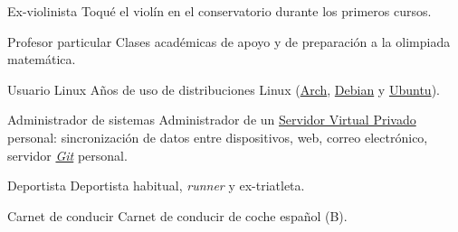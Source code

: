 

\cvachievement{\faMusic}
{Ex-violinista \smallskip}
{\small {}%
  \small{}}
Toqué el violín en el conservatorio durante los primeros cursos.

\divider

\cvachievement{\faGroup}
{Profesor particular \smallskip}
{Clases académicas de apoyo y de preparación a la olimpiada matemática.}

\divider

\cvachievement{\faLinux}
{Usuario Linux \smallskip}
{Años de uso de distribuciones Linux (\href{https://www.archlinux.org/}{Arch},
\href{https://www.debian.org/}{Debian} y \href{https://ubuntu.com/}{Ubuntu}).}

\divider

\cvachievement{\faServer}
{Administrador de sistemas}
{Administrador de un
\href{https://es.wikipedia.org/wiki/Servidor_virtual_privado}{Servidor Virtual
Privado} personal: sincronización de datos entre dispositivos, web, correo
electrónico, servidor \href{https://es.wikipedia.org/wiki/Git}{\textit{Git}}
personal.}

\divider

\cvachievement{\faHeartbeat}
{Deportista \smallskip}
{Deportista habitual, \textit{runner} y ex-triatleta.}

\divider

\cvachievement{\faCar}
{Carnet de conducir \smallskip}
{\small {}%
  \small{}}
Carnet de conducir de coche español (B).
